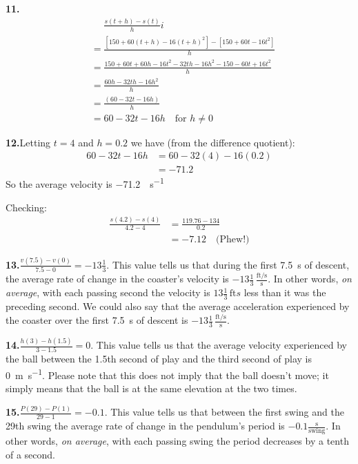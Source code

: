 \documentclass[10pt,oneside,]{book}
\theoremstyle{plain}
\theoremstyle{definition}
\numberwithin{equation}{section}
\newcommand{\fe}[2]{#1\mathopen{}\left(#2\right)\mathclose{}}
\begin{document}
\par\smallskip
\noindent\textbf{11.}\quad{}\begin{align*}
&\phantom{={}}\frac{\fe{s}{t+h}-\fe{s}{t}}{h}i\\
&=\frac{\left[150+60(t+h)-16(t+h)^2\right]-\left[150+60t-16t^2\right]}{h}\\
&=\frac{150+60t+60h-16t^2-32th-16h^2-150-60t+16t^2}{h}\\
&=\frac{60h-32th-16h^2}{h}\\
&=\frac{(60-32t-16h)}{h}\\
&=60-32t-16h\quad\text{for $h\neq0$}
\end{align*}%
\par\smallskip
\noindent\textbf{12.}\quad{}Letting \(t=4\) and \(h=0.2\) we have (from the difference quotient):\begin{align*}
60-32t-16h&=60-32(4)-16(0.2)\\
&=-71.2
\end{align*}So the average velocity is \SI{-71.2}{\foot\per\second}%
\par
Checking:\begin{align*}
\frac{\fe{s}{4.2}-\fe{s}{4}}{4.2-4}&=\frac{119.76-134}{0.2}\\
&=-7.12\quad\text{(Phew!)}
\end{align*}%
\par\smallskip
\noindent\textbf{13.}\quad{}\(\frac{\fe{v}{7.5}-\fe{v}{0}}{7.5-0}=-13\frac{1}{3}\). This value tells us that during the first \SI{7.5}{\second} of descent, the average rate of change in the coaster's velocity is \(-13\frac{1}{3}\,\frac{\text{ft/s}}{\text{s}}\).  In other words, \emph{on average}, with each passing second the velocity is \(13\frac{1}{3}\,\text{ft}{s}\) less than it was the preceding second.  We could also say that the average acceleration experienced by the coaster over the first \SI{7.5}{\second} of descent is \(-13\frac{1}{3}\,\frac{\text{ft/s}}{\text{s}}\).%
\par\smallskip
\noindent\textbf{14.}\quad{}\(\frac{\fe{h}{3}-\fe{h}{1.5}}{3-1.5}=0\). This value tells us that the average velocity experienced by the ball between the 1.5th second of play and the third second of play is \SI{0}{\meter\per\second}.  Please note that this does not imply that the ball doesn't move; it simply means that the ball is at the same elevation at the two times.%
\par\smallskip
\noindent\textbf{15.}\quad{}\(\frac{\fe{P}{29}-\fe{P}{1}}{29-1}=-0.1\). This value tells us that between the first swing and the 29th swing the average rate of change in the pendulum's period is \(-0.1\frac{\text{s}}{\text{swing}}\).  In other words, \emph{on average}, with each passing swing the period decreases by a tenth of a second.%
\end{document}
